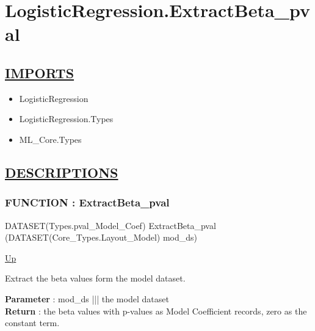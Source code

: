 \chapter*{LogisticRegression.ExtractBeta\_pval}
\hypertarget{ecldoc:toc:LogisticRegression.ExtractBeta_pval}{}

\section*{\underline{IMPORTS}}
\begin{itemize}
\item LogisticRegression
\item LogisticRegression.Types
\item ML\_Core.Types
\end{itemize}

\section*{\underline{DESCRIPTIONS}}
\subsection*{FUNCTION : ExtractBeta\_pval}
\hypertarget{ecldoc:logisticregression.extractbeta_pval}{}
\begin{minipage}[t]{\textwidth}
\begin{flushleft}
DATASET(Types.pval\_Model\_Coef) ExtractBeta\_pval (DATASET(Core\_Types.Layout\_Model) mod\_ds)
\end{flushleft}
\end{minipage}
\hyperlink{ecldoc:toc:LogisticRegression}{Up}

\par
Extract the beta values form the model dataset.
\par
\textbf{Parameter} : mod\_ds ||| the model dataset \\
\textbf{Return} : the beta values with p-values as Model Coefficient records, zero as the constant term. \\
